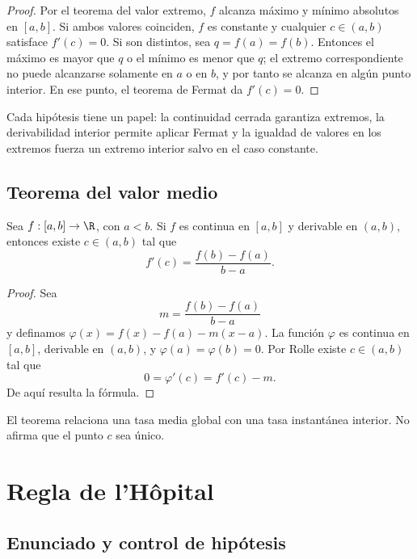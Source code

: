\begin{proof}
Por el teorema del valor extremo, \(f\) alcanza máximo y mínimo absolutos en
\([a,b]\). Si ambos valores coinciden, \(f\) es constante y cualquier
\(c\in(a,b)\) satisface \(f'(c)=0\). Si son distintos, sea
\(q=f(a)=f(b)\). Entonces el máximo es mayor que \(q\) o el mínimo es menor
que \(q\); el extremo correspondiente no puede alcanzarse solamente en
\(a\) o en \(b\), y por tanto se alcanza en algún punto interior. En ese
punto, el teorema de Fermat da \(f'(c)=0\).
\end{proof}

Cada hipótesis tiene un papel: la continuidad cerrada garantiza extremos, la
derivabilidad interior permite aplicar Fermat y la igualdad de valores en los
extremos fuerza un extremo interior salvo en el caso constante.

\subsection{Teorema del valor medio}

\begin{teorema}
Sea \(f:[a,b]\to\R\), con \(a<b\). Si \(f\) es continua en \([a,b]\) y
derivable en \((a,b)\), entonces existe \(c\in(a,b)\) tal que
\[
  f'(c)=\frac{f(b)-f(a)}{b-a}.
\]
\end{teorema}

\begin{proof}
Sea
\[
  m=\frac{f(b)-f(a)}{b-a}
\]
y definamos \(\varphi(x)=f(x)-f(a)-m(x-a)\). La función \(\varphi\) es
continua en \([a,b]\), derivable en \((a,b)\), y
\(\varphi(a)=\varphi(b)=0\). Por Rolle existe \(c\in(a,b)\) tal que
\[
  0=\varphi'(c)=f'(c)-m.
\]
De aquí resulta la fórmula.
\end{proof}

El teorema relaciona una tasa media global con una tasa instantánea interior.
No afirma que el punto \(c\) sea único.

\section{Regla de l'Hôpital}
\label{sec:lhopital}

\subsection{Enunciado y control de hipótesis}

